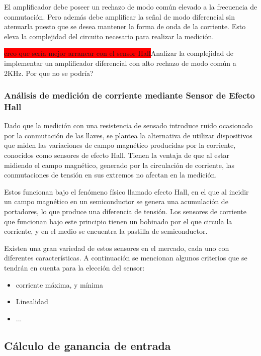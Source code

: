 El amplificador debe poseer un rechazo de modo común elevado a la frecuencia de conmutación. Pero además debe amplificar la señal de modo diferencial sin atenuarla puesto que se desea mantener la forma de onda de la corriente. Esto eleva la complejidad del circuito necesario para realizar la medición.

\colorbox{red}{creo que sería mejor arrancar con el sensor Hall}Analizar la complejidad de implementar un amplificador diferencial con alto rechazo de modo común a 2KHz. Por que no se podría?


\subsubsection{Análisis de medición de corriente mediante Sensor de Efecto Hall}

Dado que la medición con una resistencia de sensado introduce ruido ocasionado por la conmutación de las llaves, se plantea la alternativa de utilizar dispositivos que miden las variaciones de campo magnético producidas por la corriente, conocidos como sensores de efecto Hall. Tienen la ventaja de que al estar midiendo el campo magnético, generado por la circulación de corriente, las conmutaciones de tensión en sus extremos no afectan en la medición.

Estos funcionan bajo el fenómeno físico llamado efecto Hall, en el que al incidir un campo magnético en un semiconductor se genera una acumulación de portadores, lo que produce una diferencia de tensión. Los sensores de corriente que funcionan bajo este principio tienen un bobinado por el que circula la corriente, y en el medio se encuentra la pastilla de semiconductor.

Existen una gran variedad de estos sensores en el mercado, cada uno con diferentes características. A continuación se mencionan algunos criterios que se tendrán en cuenta para la elección del sensor:

\begin{itemize}
	\item corriente máxima, y mínima
	\item Linealidad
	\item ...	
\end{itemize}


\subsection{Cálculo de ganancia de entrada}






